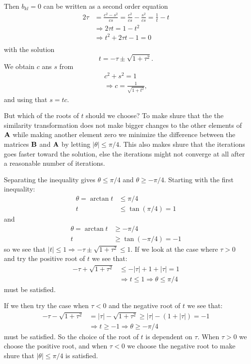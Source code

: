 \documentclass[11pt,a4wide]{article}
\begin{document}
Then $b_{kl} = 0$ can be written as a second order equation
\begin{align*}
2\tau &= \frac{c^2 - s^2}{cs} = \frac{c^2}{cs} - \frac{s^2}{cs} = \frac{1}{t} - t\\
&\Rightarrow 2\tau t = 1 - t^2 \\
&\Rightarrow t^2 +2\tau t - 1 = 0\\
\end{align*}
with the solution
\[
t = -\tau \pm\sqrt{1 + \tau^2}.
\]
We obtain $c$ ans $s$ from
\begin{align*}
c^2 + s^2 = 1\\
\Rightarrow c = \frac{1}{\sqrt{1+t^2}},
\end{align*}
and using that $s=tc$.  

But which of the roots of $t$ should we choose? To make shure that the the similarity transformation does not make bigger changes to the other elements of $\bf A$ while making another element zero we minimize the difference between the matrices ${\bf B}$ and ${\bf A}$ by letting  $|\theta| \leq \pi /4$. This also makes shure that the iterations goes faster toward the solution, else the iterations might not converge at all after a reasonable number of iterations. 

Separating the inequality gives $\theta \leq \pi/4$ and $\theta \geq -\pi/4$. Starting with the first inequality:
\begin{align*}
\theta = \arctan t &\leq \pi/4 \\
t &\leq \tan (\pi/4) = 1
\end{align*}
and 
\begin{align*}
\theta = \arctan t &\geq -\pi/4 \\
t &\geq \tan(-\pi/4) = -1
\end{align*}
so we see that $|t| \leq 1\Rightarrow -\tau \pm \sqrt{1 + \tau^2} \leq 1$. If we look at the case where $\tau > 0$ and try the positive root of $t$ we see that:
\begin{align*}
-\tau + \sqrt{1 + \tau^2} &\leq -|\tau| + 1 + |\tau| = 1 \\
&\Rightarrow t \leq 1 \Rightarrow \theta \leq \pi/4
\end{align*}
must be satisfied.

If we then try the case when $\tau < 0$ and the negative root of $t$ we see that:
\begin{align*}
-\tau - \sqrt{1 + \tau^2} &= |\tau| - \sqrt{1 + \tau^2} \geq |\tau| - (1 + |\tau|) = -1 \\
&\Rightarrow t \geq -1 \Rightarrow \theta \geq -\pi/4
\end{align*}
must be satisfied. So the choice of the root of $t$ is dependent on $\tau$. When $\tau > 0$ we choose the positive root, and when $\tau< 0$ we choose the negative root to make shure that $|\theta| \leq \pi /4 $ is satisfied. \\~\\
\end{document}
